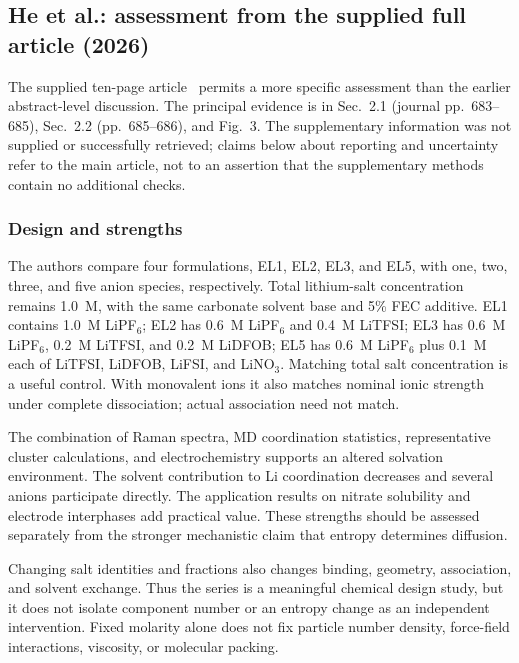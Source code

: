 \documentclass[11pt,a4paper]{article}
\begin{document}
\subsection{He et al.: assessment from the supplied full article (2026)}
\label{sec:HeAssessment}
The supplied ten-page article~\cite{He2026} permits a more specific assessment
than the earlier abstract-level discussion. The principal evidence is in
Sec.~2.1 (journal pp.~683--685), Sec.~2.2 (pp.~685--686), and Fig.~3.
The supplementary information was not supplied or successfully retrieved;
claims below about reporting and uncertainty refer to the main article,
not to an assertion that the supplementary methods contain no additional checks.

\subsubsection{Design and strengths}
The authors compare four formulations, EL1, EL2, EL3, and EL5, with one,
two, three, and five anion species, respectively. Total lithium-salt
concentration remains 1.0~M, with the same carbonate solvent base and 5\%
FEC additive. EL1 contains 1.0~M LiPF$_6$; EL2 has 0.6~M LiPF$_6$ and
0.4~M LiTFSI; EL3 has 0.6~M LiPF$_6$, 0.2~M LiTFSI, and 0.2~M LiDFOB;
EL5 has 0.6~M LiPF$_6$ plus 0.1~M each of LiTFSI, LiDFOB, LiFSI, and
LiNO$_3$. Matching total salt concentration is a useful control. With
monovalent ions it also matches nominal ionic strength under complete
dissociation; actual association need not match.

The combination of Raman spectra, MD coordination statistics, representative
cluster calculations, and electrochemistry supports an altered solvation
environment. The solvent contribution to Li coordination decreases and
several anions participate directly. The application results on nitrate
solubility and electrode interphases add practical value. These strengths
should be assessed separately from the stronger mechanistic claim that
entropy determines diffusion.

Changing salt identities and fractions also changes binding, geometry,
association, and solvent exchange. Thus the series is a meaningful chemical
design study, but it does not isolate component number or an entropy change
as an independent intervention. Fixed molarity alone does not fix particle
number density, force-field interactions, viscosity, or molecular packing.
\end{document}
